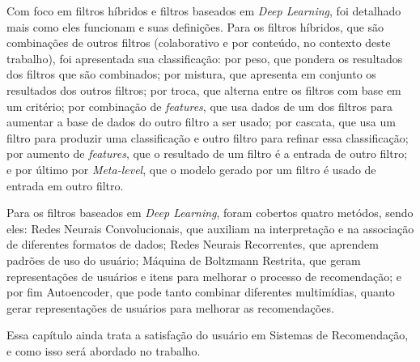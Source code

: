 Com foco em filtros híbridos e filtros baseados em \textit{Deep Learning}, foi detalhado mais como eles funcionam e suas definições.
Para os filtros híbridos, que são combinações de outros filtros (colaborativo e por conteúdo, no contexto deste trabalho),
foi apresentada sua classificação: por peso, que pondera os resultados dos filtros que são combinados; por mistura, que 
apresenta em conjunto os resultados dos outros filtros; por troca, que alterna entre os filtros com base em um critério;
por combinação de \textit{features}, que usa dados de um dos filtros para aumentar a base de dados do outro filtro a ser usado;
por cascata, que usa um filtro para produzir uma classificação e outro filtro para refinar essa classificação; por aumento
de \textit{features}, que o resultado de um filtro é a entrada de outro filtro; e por último por \textit{Meta-level}, que
o modelo gerado por um filtro é usado de entrada em outro filtro.

Para os filtros baseados em \textit{Deep Learning}, foram cobertos quatro metódos, sendo eles: Redes Neurais 
Convolucionais, que auxiliam na interpretação e na associação de diferentes formatos de dados; Redes Neurais Recorrentes, 
que aprendem padrões de uso do usuário; Máquina de Boltzmann Restrita, que geram representações de usuários
e itens para melhorar o processo de recomendação; e por fim Autoencoder, que pode tanto combinar diferentes multimídias, quanto 
gerar representações de usuários para melhorar as recomendações.

Essa capítulo ainda trata a satisfação do usuário em Sistemas de Recomendação, e como isso será abordado
no trabalho.